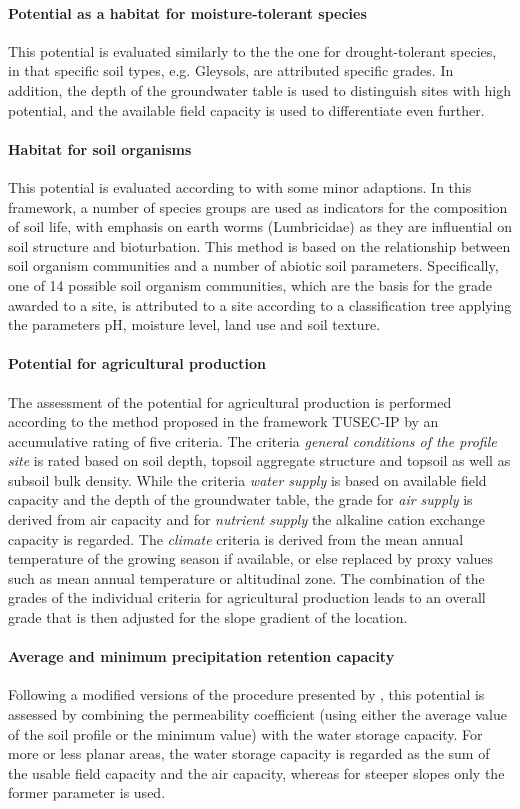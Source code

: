 \documentclass[preprint,12pt,authoryear]{elsarticle}
\begin{document}
\paragraph{Potential as a habitat for moisture-tolerant species}
This potential is evaluated similarly to the the one for drought-tolerant species, in that specific soil types, e.g. Gleysols, are attributed specific grades. In addition, the depth of the groundwater table is used to distinguish sites with high potential, and the available field capacity is used to differentiate even further.
\paragraph{Habitat for soil organisms}
This potential is evaluated according to \cite{Beylich2005} with some minor adaptions. In this framework, a number of species groups are used as indicators for the composition of soil life, with emphasis on earth worms (Lumbricidae) as they are influential on soil structure and bioturbation. This method is based on the relationship between soil organism communities and a number of abiotic soil parameters. Specifically, one of 14 possible soil organism communities, which are the basis for the grade awarded to a site, is attributed to a site according to a classification tree applying the parameters pH, moisture level, land use and soil texture.
\paragraph{Potential for agricultural production}
The assessment of the potential for agricultural production is performed according to the method proposed in the framework TUSEC-IP \citep{Lehmann2008} by an accumulative rating of five criteria. The criteria \emph{general conditions of the profile site} is rated based on soil depth, topsoil aggregate structure and topsoil as well as subsoil bulk density. While the criteria \emph{water supply} is based on available field capacity and the depth of the groundwater table, the grade for \emph{air supply} is derived from air capacity and for \emph{nutrient supply} the alkaline cation exchange capacity is regarded. The \emph{climate} criteria is derived from the mean annual temperature of the growing season if available, or else replaced by proxy values such as mean annual temperature or altitudinal zone. The combination of the grades of the individual criteria for agricultural production leads to an overall grade that is then adjusted for the slope gradient of the location.
\paragraph{Average and minimum precipitation retention capacity}
Following a modified versions of the procedure presented by \cite{BAYGLA2003}, this potential is assessed by combining the permeability coefficient (using either the average value of the soil profile or the minimum value) with the water storage capacity. For more or less planar areas, the water storage capacity is regarded as  the sum of the usable field capacity and the air capacity, whereas for steeper slopes only the former parameter is used.
\end{document}
